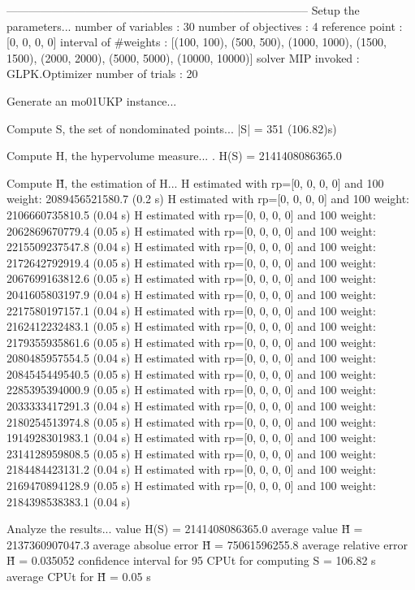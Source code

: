 --------------------------------------------------------------------------------
Setup the parameters...
  number of variables  : 30
  number of objectives : 4
  reference point      : [0, 0, 0, 0]
  interval of #weights : [(100, 100), (500, 500), (1000, 1000), (1500, 1500), (2000, 2000), (5000, 5000), (10000, 10000)]
  solver MIP invoked   : GLPK.Optimizer
  number of trials     : 20

Generate an mo01UKP instance...

Compute S, the set of nondominated points...
  |S|  = 351 (106.82)s)

Compute H, the hypervolume measure...
. H(S) = 2141408086365.0

Compute H̃, the estimation of H...
  H estimated with rp=[0, 0, 0, 0] and 100 weight:  2089456521580.7  (0.2 s)
  H estimated with rp=[0, 0, 0, 0] and 100 weight:  2106660735810.5  (0.04 s)
  H estimated with rp=[0, 0, 0, 0] and 100 weight:  2062869670779.4  (0.05 s)
  H estimated with rp=[0, 0, 0, 0] and 100 weight:  2215509237547.8  (0.04 s)
  H estimated with rp=[0, 0, 0, 0] and 100 weight:  2172642792919.4  (0.05 s)
  H estimated with rp=[0, 0, 0, 0] and 100 weight:  2067699163812.6  (0.05 s)
  H estimated with rp=[0, 0, 0, 0] and 100 weight:  2041605803197.9  (0.04 s)
  H estimated with rp=[0, 0, 0, 0] and 100 weight:  2217580197157.1  (0.04 s)
  H estimated with rp=[0, 0, 0, 0] and 100 weight:  2162412232483.1  (0.05 s)
  H estimated with rp=[0, 0, 0, 0] and 100 weight:  2179355935861.6  (0.05 s)
  H estimated with rp=[0, 0, 0, 0] and 100 weight:  2080485957554.5  (0.04 s)
  H estimated with rp=[0, 0, 0, 0] and 100 weight:  2084545449540.5  (0.05 s)
  H estimated with rp=[0, 0, 0, 0] and 100 weight:  2285395394000.9  (0.05 s)
  H estimated with rp=[0, 0, 0, 0] and 100 weight:  2033333417291.3  (0.04 s)
  H estimated with rp=[0, 0, 0, 0] and 100 weight:  2180254513974.8  (0.05 s)
  H estimated with rp=[0, 0, 0, 0] and 100 weight:  1914928301983.1  (0.04 s)
  H estimated with rp=[0, 0, 0, 0] and 100 weight:  2314128959808.5  (0.05 s)
  H estimated with rp=[0, 0, 0, 0] and 100 weight:  2184484423131.2  (0.04 s)
  H estimated with rp=[0, 0, 0, 0] and 100 weight:  2169470894128.9  (0.05 s)
  H estimated with rp=[0, 0, 0, 0] and 100 weight:  2184398538383.1  (0.04 s)

Analyze the results...
  value H(S)                  = 2141408086365.0 
  average value H̃             = 2137360907047.3 
  average absolue error H̃     = 75061596255.8 
  average relative error H̃    = 0.035052 
  confidence interval for 95%
  CPUt for computing S         = 106.82 s
  average CPUt for H̃           = 0.05 s

